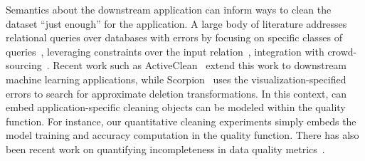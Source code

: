   Semantics about the downstream application can inform ways to clean the dataset ``just enough'' for the application.  
A large body of literature addresses relational queries over databases with errors by focusing on specific classes of queries~\cite{altwaijry2015query}, leveraging constraints over the input relation~\cite{2011Bertossi}, integration with crowd-sourcing~\cite{DBLP:conf/sigmod/BergmanMNT15}.   Recent work such as ActiveClean~\cite{DBLP:journals/pvldb/KrishnanWWFG16} extend this work to downstream machine learning applications, while Scorpion~\cite{DBLP:journals/pvldb/0002M13} uses the visualization-specified errors to search for approximate deletion transformations.   In this context, \sys can embed application-specific cleaning objects can be modeled within the quality function.  For instance, our quantitative cleaning experiments simply embeds the model training and accuracy computation in the quality function. 
There has also been recent work on quantifying incompleteness in data quality metrics~\cite{chung2016data}.



